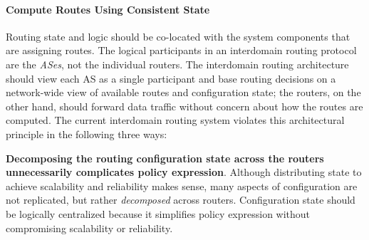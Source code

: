 \paragraph{Compute Routes Using Consistent State}

Routing state and logic should be co-located with the system components
that are assigning routes.  The logical participants in an interdomain
routing protocol are the {\em ASes\/}, not the individual routers.  The
interdomain routing architecture should view each AS as a single
participant and base routing decisions on a network-wide view of
available routes and configuration state; the routers, on the other
hand, should forward data traffic without concern about how the routes
are computed.  The current interdomain routing system violates this
architectural principle in the following three ways:
%




{\bf Decomposing the routing configuration state across the routers
unnecessarily complicates policy expression}.  Although
distributing state to achieve scalability and reliability makes sense,
many aspects of configuration are not replicated, but rather {\em
decomposed} across routers.  
Configuration state should be logically
centralized because it simplifies policy expression without compromising
scalability or reliability.

